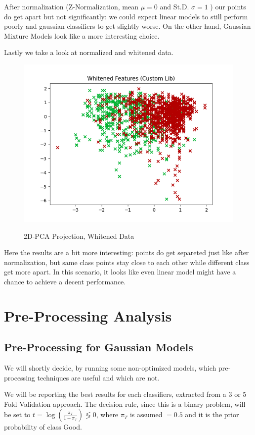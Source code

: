\documentclass[12pt, twocolumn]{article}
\begin{document}
After normalization (Z-Normalization, mean $\mu = 0$ and St.D. $\sigma = 1$ ) our points do get apart but not significantly: we could expect linear models to still perform poorly and gaussian classifiers to get slightly worse. On the other hand, Gaussian Mixture Models look like a more interesting choice.

Lastly we take a look at normalized and whitened data.

\begin{figure}[H]
    \caption{2D-PCA Projection, Whitened Data}
    {\includegraphics[width=\linewidth]{2DWhitened.png}}
    \label{2DWHI}
\end{figure}

Here the results are a bit more interesting: points do get separeted just like after normalization, but same class points stay close to each other while different class get more apart. In this scenario, it looks like even linear model might have a chance to achieve a decent performance.


\section{Pre-Processing Analysis}
\subsection{Pre-Processing for Gaussian Models}

We will shortly decide, by running some non-optimized models, which pre-processing techniques are useful and which are not. 

We will be reporting the best results for each classifiers, extracted from a 3 or 5 Fold Validation approach. The decision rule, since this is a binary problem, will be set to $\displaystyle t = \log(\frac{\pi_T}{1-\pi_T}) \lessgtr 0 $, where $\pi_T$ is assumed $ = 0.5$ and it is the prior probability of class Good.
\end{document}
